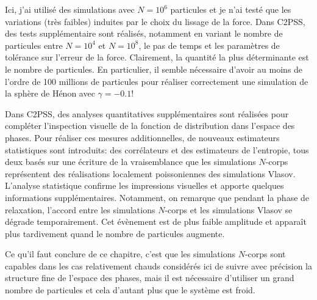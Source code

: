 		Ici, j'ai utilisé des simulations avec $N=10^6$ particules et je n'ai testé que les variations (très faibles) induites par le choix du lissage de la force. Dans
		C2PSS, des tests supplémentaire sont réalisés, notamment en variant le nombre de particules entre $N=10^4$ et $N=10^8$, le pas de temps et les
		paramètres de tolérance sur l'erreur de la force. Clairement, la quantité la plus déterminante est le nombre de particules. En particulier, il semble
		nécessaire d'avoir au moins de l'ordre de 100 millions de particules pour réaliser correctement une simulation de la sphère de Hénon avec $\gamma=-0.1$!

		Dans C2PSS, des analyses quantitatives supplémentaires sont réalisées pour compléter l'inspection visuelle de la fonction de distribution dans l'espace des phases.
		Pour réaliser ces mesures additionnelles, de nouveaux estimateurs statistiques sont introduits: des corrélateurs et des estimateurs de l'entropie, tous deux basés sur
		une écriture de la vraisemblance que les simulations $N$-corps représentent des réalisations localement poissoniennes des simulations Vlasov.
		L'analyse statistique confirme les impressions visuelles et apporte quelques informations supplémentaires. Notamment, on remarque que pendant la phase de relaxation,
		l'accord entre les simulations $N$-corps et les simulations Vlasov se dégrade temporairement. Cet évènement est de plus faible amplitude et apparaît plus
		tardivement quand le nombre de particules augmente.

		Ce qu'il faut conclure de ce chapitre, c'est que les simulations $N$-corps sont capables dans les cas relativement chauds considérés ici de suivre avec précision la
		structure fine
		de l'espace des phases, mais il est nécessaire d'utiliser un grand nombre de particules et cela d'autant plus que le système est froid.







